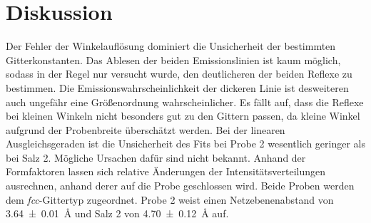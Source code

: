 \section{Diskussion}\label{sec:Diskussion}
Der Fehler der Winkelauflösung  dominiert die Unsicherheit der bestimmten
Gitterkonstanten. 
Das Ablesen der beiden Emissionslinien ist kaum möglich,
sodass in der Regel nur versucht wurde, den deutlicheren der beiden Reflexe zu bestimmen.
Die Emissionswahrscheinlichkeit der dickeren Linie ist desweiteren auch
ungefähr eine Größenordnung wahrscheinlicher. 
Es fällt auf, dass die Reflexe bei kleinen Winkeln nicht besonders gut zu den
Gittern passen, da kleine Winkel aufgrund der Probenbreite überschätzt werden.
Bei der linearen Ausgleichsgeraden ist die Unsicherheit des Fits bei Probe 2 
wesentlich geringer als bei Salz 2. 
Mögliche Ursachen dafür sind nicht bekannt. 
Anhand der Formfaktoren lassen sich relative Änderungen der Intensitätsverteilungen ausrechnen,
anhand derer auf die Probe geschlossen wird.
Beide Proben werden dem \textit{fcc}-Gittertyp zugeordnet. 
Probe 2 weist einen Netzebenenabstand von \SI{3.64 +- 0.01}{\angstrom}
und Salz 2 von \SI{4.70 +- 0.12}{\angstrom} auf.
